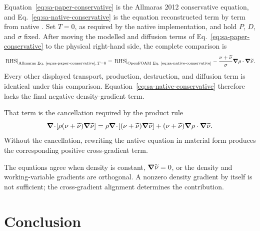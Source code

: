 Equation~\eqref{eq:sa-paper-conservative} is the Allmaras 2012 conservative
equation, and Eq.~\eqref{eq:sa-native-conservative} is the equation
reconstructed term by term from native \SAOF{}.  Set \(T=0\), as required by
the native implementation, and hold \(P\), \(D\), and \(\sigma\) fixed.
After moving the modelled and diffusion terms of
Eq.~\eqref{eq:sa-paper-conservative} to the physical right-hand side, the
complete comparison is
\begin{equation}
  \left.\mathrm{RHS}\right|_{\text{Allmaras Eq.~\eqref{eq:sa-paper-conservative}},\,T=0}
  =
  \left.\mathrm{RHS}\right|_{\text{OpenFOAM Eq.~\eqref{eq:sa-native-conservative}}}
  -\frac{\nu+\widetilde{\nu}}{\sigma}
   \boldsymbol{\nabla}\rho\mathbin{\cdot}\boldsymbol{\nabla}\widetilde{\nu}.
  \label{eq:sa-direct-comparison}
\end{equation}
Every other displayed transport, production, destruction, and diffusion term
is identical under this comparison.  Equation~\eqref{eq:sa-native-conservative}
therefore lacks the final negative density-gradient term.

That term is the cancellation required by the product rule
\[
  \boldsymbol{\nabla}\!\cdot\!\left[
    \rho(\nu+\widetilde{\nu})\boldsymbol{\nabla}\widetilde{\nu}
  \right]
  =
  \rho\boldsymbol{\nabla}\!\cdot\!\left[
    (\nu+\widetilde{\nu})\boldsymbol{\nabla}\widetilde{\nu}
  \right]
  +(\nu+\widetilde{\nu})
   \boldsymbol{\nabla}\rho\mathbin{\cdot}\boldsymbol{\nabla}\widetilde{\nu}.
\]
Without the cancellation, rewriting the native equation in material form
produces the corresponding positive cross-gradient term.


The equations agree when density is constant,
\(\boldsymbol{\nabla}\widetilde{\nu}=0\), or the density and working-variable gradients
are orthogonal.  A nonzero density gradient by itself is not sufficient; the
cross-gradient alignment determines the contribution.

\section{Conclusion}
\label{sec:sa-conclusion}

